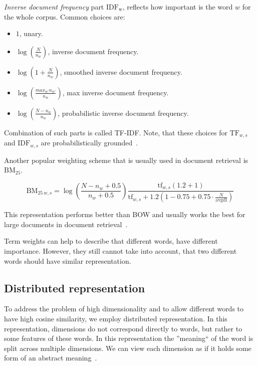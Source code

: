     \emph{Inverse document frequency} part $\mathrm{IDF_w}$, reflects how important is the word $w$ for the whole corpus.
    Common choices are:
    \begin{itemize}
        \item $1$, unary.
        \item $\log \left(\frac{N}{n_w} \right)$, inverse document frequency.
        \item $\log \left( 1+\frac{N}{n_w} \right)$, smoothed inverse document frequency.
        \item $\log \left( \frac{max_{w'} n_{w'}}{n_w} \right)$, max inverse document frequency.
        \item $\log \left(\frac{N-n_w}{n_w} \right)$, probabilistic inverse document frequency.
    \end{itemize}

    Combination of such parts is called TF-IDF.
    Note, that these choices for $\mathrm{TF}_{w,s}$ and $\mathrm{IDF}_{w,s}$ are probabilistically grounded~\cite{aizawa2003information}. %
    
    Another popular weighting scheme that is usually used in document retrieval is $\mathrm{BM_{25}}$. 
    
    $$\mathrm{BM}_{25~w,s} = \log \left(\frac{N-n_w+0.5}{n_w + 0.5}\right)    \frac{\mathrm{tf}_{w,s} (1.2 + 1)}{\mathrm{tf}_{w,s} + 1.2  \left(1 - 0.75 + 0.75 \cdot \frac{N}{\text{avgdl}}\right)}$$
    
    This representation performs better than BOW and usually works the best for large documents in document retrieval~\cite{li2014semantic}.
    
    Term weights can help to describe that different words, have different importance.
    However, they still cannot take into account, that two different words should have similar representation.
    
    
    \subsection{Distributed representation}
    
    To address the problem of high dimensionality and to allow different words to have high cosine similarity, we employ distributed representation.
    In this representation, dimensions do not correspond directly to words, but rather to some features of these words.
    In this representation the ''meaning`` of the word is split across multiple dimensions.
    We can view each dimension as if it holds some form of an abstract meaning~\cite{le2014distributed}. 
    

